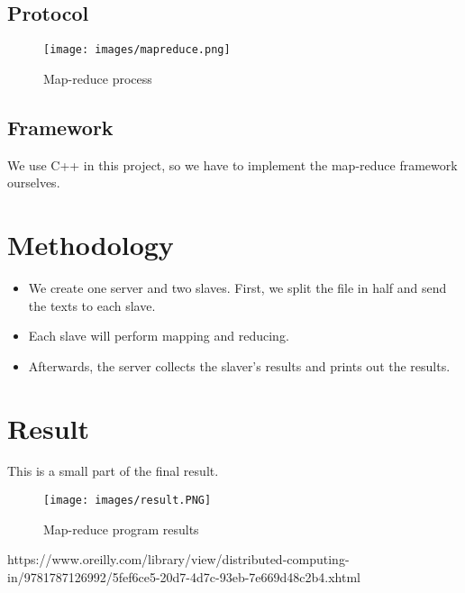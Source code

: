 \documentclass[13pt]{article}
\begin{document}
\subsection{Protocol}
\begin{figure}[h]
    \centering
    \texttt{[image: images/mapreduce.png]}
    \caption{Map-reduce process\cite{MPI word count}}
    \label{fig:protocol}
\end{figure}

\subsection{Framework}
\noindent%
We use C++ in this project, so we have to implement the map-reduce framework ourselves.

\section{Methodology}
\begin{itemize}
    \item We create one server and two slaves. First, we split the file in half and send the texts to each slave.
    \item Each slave will perform mapping and reducing.
    \item Afterwards, the server collects the slaver's results and prints out the results.
\end{itemize}

\section{Result}
\noindent%
This is a small part of the final result.
\begin{figure}[h]
    \centering
    \texttt{[image: images/result.PNG]}
    \caption{Map-reduce program results}
    \label{fig:protocol}
\end{figure}

\begin{thebibliography}{9}
https://www.oreilly.com/library/view/distributed-computing-in/9781787126992/5fef6ce5-20d7-4d7c-93eb-7e669d48c2b4.xhtml
\end{thebibliography}
\end{document}
